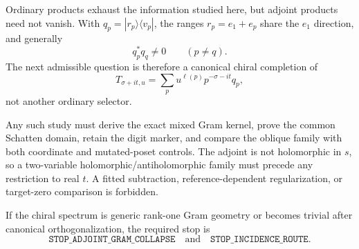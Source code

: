 Ordinary products exhaust the information studied here, but adjoint products
need not vanish. With \(q_p=|r_p\rangle\langle v_p|\), the ranges
\(r_p=e_1+e_p\) share the \(e_1\) direction, and generally
\[
q_p^*q_q\ne0\qquad(p\ne q).
\]
The next admissible question is therefore a canonical chiral completion of
\[
T_{\sigma+it,u}
=\sum_p u^{\ell(p)}p^{-\sigma-it}q_p,
\]
not another ordinary selector.

Any such study must derive the exact mixed Gram kernel, prove the common
Schatten domain, retain the digit marker, and compare the oblique family with
both coordinate and mutated-poset controls. The adjoint is not holomorphic in
\(s\), so a two-variable holomorphic/antiholomorphic family must precede any
restriction to real \(t\). A fitted subtraction, reference-dependent
regularization, or target-zero comparison is forbidden.

If the chiral spectrum is generic rank-one Gram geometry or becomes trivial
after canonical orthogonalization, the required stop is
\[
\texttt{STOP\_ADJOINT\_GRAM\_COLLAPSE}
\quad\text{and}\quad
\texttt{STOP\_INCIDENCE\_ROUTE}.
\]
